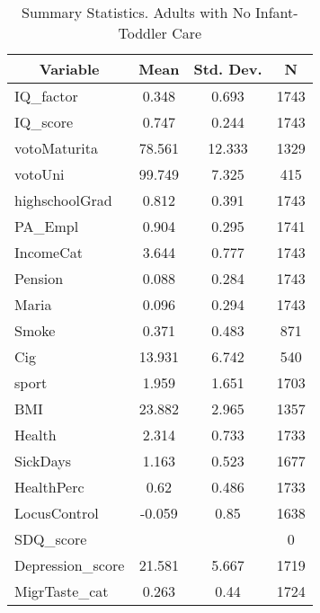 
\begin{table}[htbp]\centering \caption{Summary Statistics. Adults with No Infant-Toddler Care \label{schoolAdultasiloNone}}
\begin{tabular}{l c c  c}\hline\hline
\multicolumn{1}{c}{\textbf{Variable}} & \textbf{Mean}
 & \textbf{Std. Dev.} & \textbf{N}\\ \hline
IQ\_factor & 0.348 & 0.693  & 1743\\
IQ\_score & 0.747 & 0.244  & 1743\\
votoMaturita & 78.561 & 12.333  & 1329\\
votoUni & 99.749 & 7.325  & 415\\
highschoolGrad & 0.812 & 0.391  & 1743\\
PA\_Empl & 0.904 & 0.295  & 1741\\
IncomeCat & 3.644 & 0.777  & 1743\\
Pension & 0.088 & 0.284  & 1743\\
Maria & 0.096 & 0.294  & 1743\\
Smoke & 0.371 & 0.483  & 871\\
Cig & 13.931 & 6.742  & 540\\
sport & 1.959 & 1.651  & 1703\\
BMI & 23.882 & 2.965  & 1357\\
Health & 2.314 & 0.733  & 1733\\
SickDays & 1.163 & 0.523  & 1677\\
HealthPerc & 0.62 & 0.486  & 1733\\
LocusControl & -0.059 & 0.85  & 1638\\
SDQ\_score &  &   & 0\\
Depression\_score & 21.581 & 5.667  & 1719\\
MigrTaste\_cat & 0.263 & 0.44  & 1724\\
\hline\end{tabular}
\end{table}

